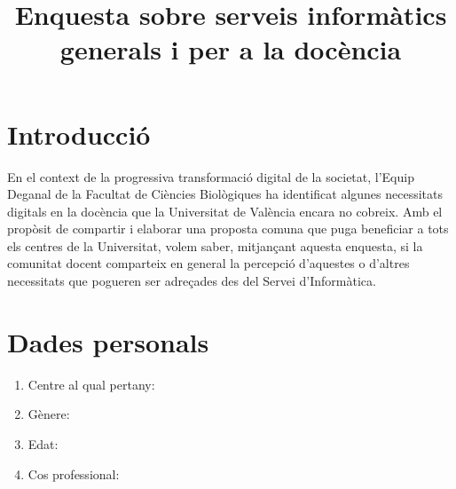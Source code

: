 \documentclass[a4paper,12pt]{article}
\title{Enquesta sobre serveis informàtics generals i per a la docència}
\begin{document}
\section{Introducció}
En el context de la progressiva transformació digital de la societat,
l'Equip Deganal de la Facultat de Ciències Biològiques ha identificat
algunes necessitats digitals en la docència que la Universitat de València
encara no cobreix. Amb el propòsit de compartir i elaborar una proposta
comuna que puga beneficiar a tots els centres de la Universitat, volem
saber, mitjançant aquesta enquesta, si la comunitat docent comparteix
en general la percepció d'aquestes o d'altres necessitats que pogueren
ser adreçades des del Servei d'Informàtica.

\section{Dades personals}
\begin{enumerate}
\item Centre al qual pertany:
\item Gènere:
\item Edat:
\item Cos professional:
\end{enumerate}
\end{document}
